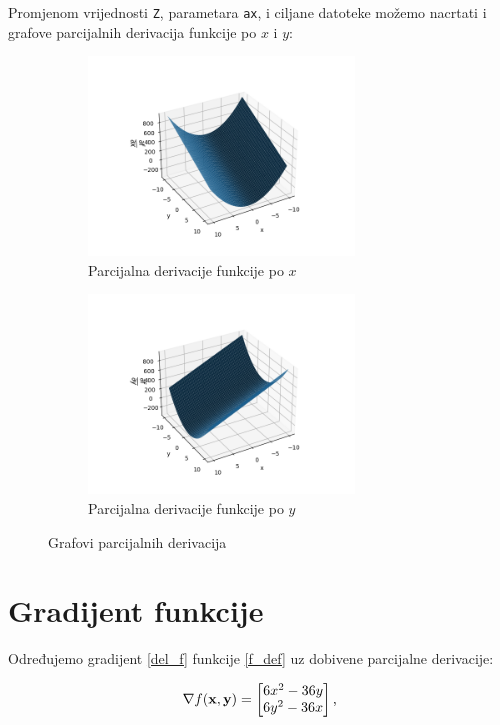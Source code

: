 Promjenom vrijednosti \verb|Z|, parametara \verb|ax|, i ciljane datoteke možemo nacrtati i grafove parcijalnih derivacija funkcije po $x$ i $y$:
\begin{figure}[H]
    \begin{subfigure}{0.5\linewidth}
        \includegraphics[width=200pt]{figures/graf_fdx.png}
        \caption{Parcijalna derivacije funkcije po $x$}
    \end{subfigure}%
    \begin{subfigure}{0.5\linewidth}
        \includegraphics[width=200pt]{figures/graf_fdy.png}
        \caption{Parcijalna derivacije funkcije po $y$}
    \end{subfigure}
    \caption{Grafovi parcijalnih derivacija}
\end{figure}

\newpage
\section{Gradijent funkcije}

Određujemo gradijent \eqref{del_f} funkcije \eqref{f_def} uz dobivene parcijalne derivacije:

\begin{equation}
    \nabla f(\mathbf{x}, \mathbf{y}) = \begin{bmatrix}
        6x^2 - 36y \\
        6y^2 - 36x
    \end{bmatrix}\textnormal{,}
\end{equation}

